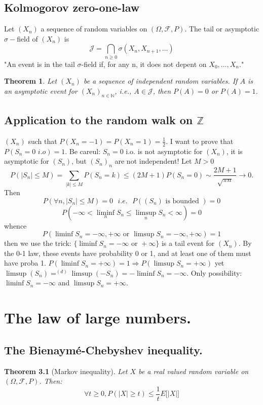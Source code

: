 \documentclass[10pt,a4paper]{book}
\newcommand{\N}{\mathbb{N}}
\newcommand{\Z}{\mathbb{Z}}
\newtheorem{theorem}{Theorem}[section]
\theoremstyle{definition}
\begin{document}
\section{Kolmogorov zero-one-law}
Let $(X_n)$ a sequence of random variables on $(\Omega,\mathcal{F},P)$. The tail or asymptotic $\sigma-$field of $(X_n)$ is 
$$\mathcal{J}=\bigcap_{n\geq 0}\sigma(X_n,X_{n+1},\ldots)$$
"An event is in the tail $\sigma$-field if, for any n, it does not depent on $X_0,\ldots,X_n$."
\begin{theorem}
Let $(X_n)$ be a sequence of independent random variables. If $A$ is an asymptotic event for $(X_n)_{n\in\N}$, i.e., $A\in\mathcal{J}$, then $P(A)=0$ or $P(A)=1$. 
\end{theorem}

\section{Application to the random walk on $\Z$}
$(X_n)$ such that $P(X_n=-1)=P(X_n=1)=\frac{1}{2}$. I want to prove that $P(S_n=0\,\,i.o)=1$. Be careul: $S_n=0$ i.o. is not asymptotic for $(X_n)$, it is asymptotic for $(S_n)$, but $(S_n)_n$ are not independent! 
\proof Let $M>0$
$$P(|S_n|\leq M)=\sum_{|k|\leq M}P(S_n=k)\leq (2M+1)P(S_n=0)\sim\frac{2M+1}{\sqrt{\pi n}}\to 0.$$
Then
$$P(\forall n, |S_n|\leq M)=0\,\,\,\,i.e.\,\,\,\, P((S_n)\text{ is bounded })=0$$
$$P(-\infty<\liminf_n S_n\leq \limsup_n S_n<\infty)=0$$
whence
$$P(\liminf S_n=-\infty,+\infty\text{ or }\limsup S_n=-\infty,+\infty)=1$$
then we use the trick: $\{\liminf S_n=-\infty\text{ or }+\infty\}$ is a tail event for $(X_n)$. By the 0-1 law, these events have probability 0 or 1, and at least one of them must have proba 1. $P(\liminf S_n=+\infty)=1\Rightarrow P(\limsup S_n=+\infty)$ yet $\limsup(S_n)=^{(d)}\limsup(-S_n)=-\liminf S_n=-\infty$.
Only possibility: $\liminf S_n=-\infty$ and $\limsup S_n=+\infty$. 

\chapter{The law of large numbers.}

\section{The Bienaymé-Chebyshev inequality.}

\begin{theorem}[Markov inequality]
Let $X$ be a real valued random variable on $(\Omega, \mathcal{F}, P)$. Then:
\[
\forall t \geq 0, P(|X| \geq t) \leq \frac{1}{t} E\big[|X|\big]
\]
\end{theorem}
\end{document}
